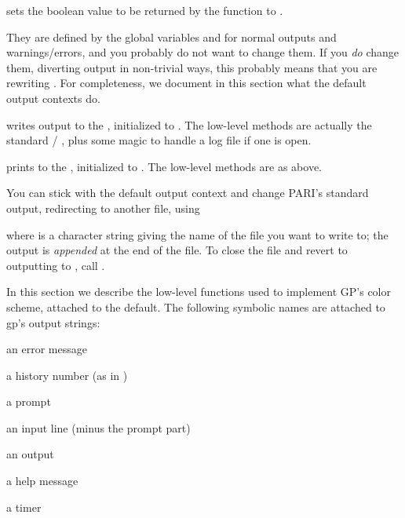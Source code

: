  sets the boolean value
to be returned by the function  to .

 They are defined by the global variables
 and  for normal outputs and warnings/errors, and you
probably do not want to change them. If you \emph{do} change them, diverting
output in non-trivial ways, this probably means that you are rewriting
. For completeness, we document in this section what the default
output contexts do.

 writes output to the  ,
initialized to .  The low-level methods are actually the standard
 / , plus some magic to handle a log file if one is
open.

 prints to the  , initialized
to . The low-level methods are as above.

You can stick with the default  output context and change PARI's
standard output, redirecting  to another file, using

 where  is a character string
giving the name of the file you want to write to; the output is
\emph{appended} at the end of the file. To close the file and revert to
outputting to , call .

In this section we describe the low-level functions used to implement GP's
color scheme, attached to the  default. The following symbolic
names are attached to gp's output strings:

\item {} an error message

\item {} a history number (as in )

\item {} a prompt

\item {} an input line (minus the prompt part)

\item {} an output

\item {} a help message

\item {} a timer

